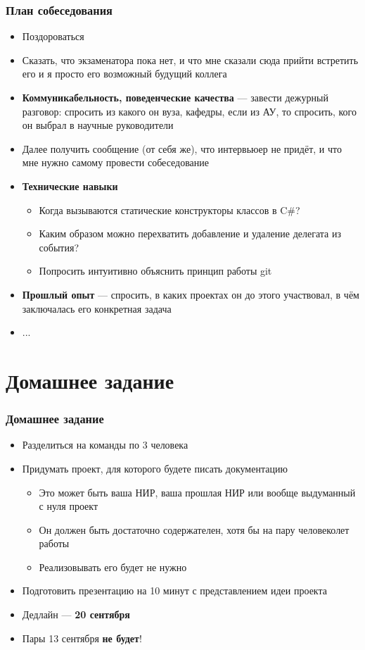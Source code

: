 \documentclass[xetex,mathserif,serif]{beamer}
\begin{document}
	\begin{frame}
		\frametitle{План собеседования}
		\begin{small}
			\begin{itemize}
				\item Поздороваться
				\item Сказать, что экзаменатора пока нет, и что мне сказали сюда прийти встретить его и я просто его возможный будущий коллега
				\item \textbf{Коммуникабельность, поведенческие качества} --- завести дежурный разговор: спросить из какого он вуза, кафедры, если из АУ, то спросить, кого он выбрал в научные руководители
				\item Далее получить сообщение (от себя же), что интервьюер не придёт, и что мне нужно самому провести собеседование
				\item \textbf{Технические навыки}
				\begin{itemize}
					\item ​Когда вызываются статические конструкторы классов в C\#?
					\item Каким образом можно перехватить добавление и удаление делегата из события?
					\item Попросить интуитивно объяснить принцип работы git
				\end{itemize}
				\item \textbf{Прошлый опыт} --- спросить, в каких проектах он до этого участвовал, в чём заключалась его конкретная задача
				\item ...
			\end{itemize}
		\end{small}
	\end{frame}

	\section{Домашнее задание}

	\begin{frame}
		\frametitle{Домашнее задание}
		\begin{itemize}
			\item Разделиться на команды по 3 человека
			\item Придумать проект, для которого будете писать документацию
			\begin{itemize}
				\item Это может быть ваша НИР, ваша прошлая НИР или вообще выдуманный с нуля проект
				\item Он должен быть достаточно содержателен, хотя бы на пару человеколет работы
				\item Реализовывать его будет не нужно
			\end{itemize}
			\item Подготовить презентацию на 10 минут с представлением идеи проекта
			\item Дедлайн --- \textbf{20 сентября}
			\item Пары 13 сентября \textbf{не будет}!
		\end{itemize}
	\end{frame}
\end{document}
